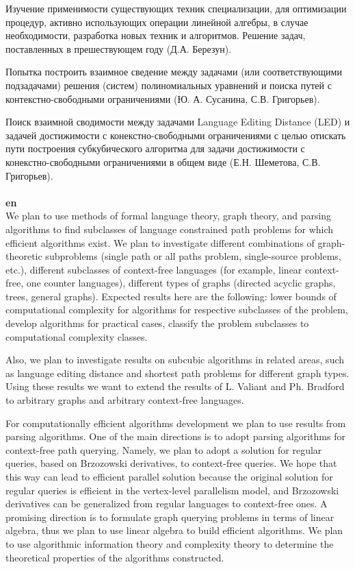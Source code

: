 \documentclass[12pt]{article}  %
\theoremstyle{remark}
\begin{document}
Изучение применимости существующих техник специализации, для оптимизации процедур, активно использующих операции линейной алгебры, в случае необходимости, разработка новых техник и алгоритмов. Решение задач, поставленных в прешествующем году (Д.А. Березун).

Попытка построить взаимное сведение между задачами (или соответствующими подзадачами) решения (систем) полиномиальных уравнений и поиска путей с контекстно-свободными ограничениями (Ю. А. Сусанина, С.В. Григорьев).

Поиск взаимной сводимости между задачами Language Editing Distance (LED) и задачей достижимости с конекстно-свободными ограничениями с целью отискать пути построения субкубического алгоритма для задачи достижимости с конекстно-свободными ограничениями в общем виде (Е.Н. Шеметова, С.В. Григорьев).
\\
\\
\textbf{en}\\
We plan to use methods of formal language theory, graph theory, and parsing algorithms to find subclasses of language constrained path problems for which efficient algorithms exist.
We plan to investigate different combinations of graph-theoretic subproblems (single path or all paths problem, single-source problems, etc.), different subclasses of context-free languages (for example, linear context-free, one counter languages), different types of graphs (directed acyclic graphs, trees, general graphs).
Expected results here are the following: lower bounds of computational complexity for algorithms for respective subclasses of the problem, develop algorithms for practical cases, classify the problem subclasses to computational complexity classes.

Also, we plan to investigate results on subcubic algorithms in related areas, such as language editing distance and shortest path problems for different graph types.
Using these results we want to extend the results of L. Valiant and Ph. Bradford to arbitrary graphs and arbitrary context-free languages.

For computationally efficient algorithms development we plan to use results from parsing algorithms.
One of the main directions is to adopt parsing algorithms for context-free path querying.
Namely, we plan to adopt a solution for regular queries, based on Brzozowski derivatives, to context-free queries.
We hope that this way can lead to efficient parallel solution because the original solution for regular queries is efficient in the vertex-level parallelism model, and Brzozowski derivatives can be generalized from regular languages to context-free ones.
A promising direction is to formulate graph querying problems in terms of linear algebra, thus we plan to use linear algebra to build efficient algorithms.
We plan to use algorithmic information theory and complexity theory to determine the theoretical properties of the algorithms constructed.
\end{document}

